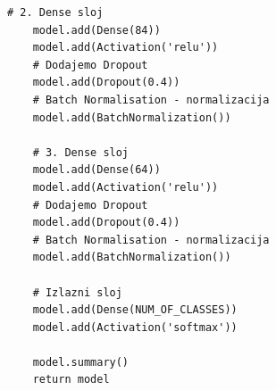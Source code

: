\documentclass[a4paper]{article}
\begin{document}
\begin{lstlisting}[caption={AlexNet},frame=single, label=code:alexNet]
    # 2. Dense sloj
    model.add(Dense(84))
    model.add(Activation('relu'))
    # Dodajemo Dropout
    model.add(Dropout(0.4))
    # Batch Normalisation - normalizacija
    model.add(BatchNormalization())

    # 3. Dense sloj
    model.add(Dense(64))
    model.add(Activation('relu'))
    # Dodajemo Dropout
    model.add(Dropout(0.4))
    # Batch Normalisation - normalizacija
    model.add(BatchNormalization())

    # Izlazni sloj
    model.add(Dense(NUM_OF_CLASSES))
    model.add(Activation('softmax'))

    model.summary()
    return model
\end{lstlisting}

\begin{figure}[h!]
\begin{center}

\end{center}
\end{figure}
\end{document}
